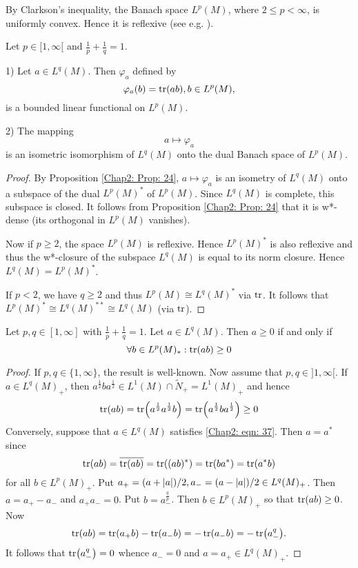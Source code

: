 By Clarkson's inequality, the Banach space $L^p(M)$, where $2\leq p<\infty$, is uniformly convex. Hence it is reflexive (see e.g. \cite[p. 127, Theorem 2]{22}).
\begin{theorem}
    Let $p\in [1,\infty[$ and $\frac{1}{p} + \frac{1}{q}=1$.\par
    1) Let $a\in L^q(M)$. Then $\varphi_a$ defined by
    \[
        \varphi_a(b)=\tr(ab),b\in L^p(M),
    \]
    is a bounded linear functional on $L^p(M)$.\par
    2) The mapping
    \[
        a\mapsto \varphi_a
    \]
    is an isometric isomorphism of $L^q(M)$ onto the dual Banach space of $L^p(M)$.
\end{theorem}
\begin{proof}
    By Proposition \ref{Chap2: Prop: 24}, $a\mapsto \varphi_a$ is an isometry of $L^q(M)$ onto a subspace of the dual $L^p(M)^*$ of $L^p(M)$. Since $L^q(M)$ is complete, this subspace is closed. It follows from Proposition \ref{Chap2: Prop: 24} that it is w*-dense (its orthogonal in $L^p(M)$ vanishes).\par
    Now if $p\geq 2$, the space $L^p(M)$ is reflexive. Hence $L^p(M)^*$ is also reflexive and thus the w*-closure of the subspace $L^q(M)$ is equal to its norm closure. Hence $L^q(M)=L^p(M)^*$.\par
    If $p<2$, we have $q\geq 2$ and thus $L^p(M)\cong L^q(M)^*$ via $\tr$. It follows that $L^p(M)^*\cong L^q(M)^{**}\cong L^q(M)$ (via $\tr$).
\end{proof}
\begin{proposition}\label{Chap2: Prop: 33}
    Let $p,q\in [1,\infty]$ with $\frac{1}{p}+\frac{1}{q}=1$. Let $a\in L^q(M)$. Then $a\geq 0$ if and only if
    \begin{equation}\label{Chap2: eqn: 37}
        \forall b\in L^p(M)_*:\tr(ab)\geq 0
    \end{equation}
\end{proposition}
\begin{proof}
    If $p,q\in \{1,\infty\}$, the result is well-known. Now assume that $p,q\in ]1,\infty[$. If $a\in L^q(M)_+$, then $a^\frac{1}{2}ba^\frac{1}{2}\in L^1(M)\cap \tilde{N}_+=L^1(M)_+$ and hence
    \[
        \tr(ab)=\tr(a^\frac{1}{2}a^\frac{1}{2}b)=\tr(a^\frac{1}{2}ba^\frac{1}{2})\geq 0
    \]
    Conversely, suppose that $a\in L^q(M)$ satisfies \eqref{Chap2: eqn: 37}. Then $a=a^*$ since
    \[
        \tr(ab)=\overline{\tr(ab)}=\tr((ab)^*)=\tr(ba^*)=\tr(a^*b)
    \]
    for all $b\in L^p(M)_+$. Put $a_+=(a+\abs{a})/2, a_-=(a-\abs{a})/2\in L^q(M)_+$. Then $a = a_+ - a_-$ and $a_+ a_- = 0$. Put $b=a_-^\frac{q}{p}$. Then $b\in L^p(M)_+$ so that $\tr(ab)\geq 0$. Now
    \[
        \tr(ab)=\tr(a_+b)-\tr(a_-b)=-\tr(a_-b)=-\tr(a_-^q).
    \]
    It follows that $\tr(a_-^q)=0$ whence $a_-= 0$ and $a = a_+\in L^q(M)_+$.
\end{proof}

